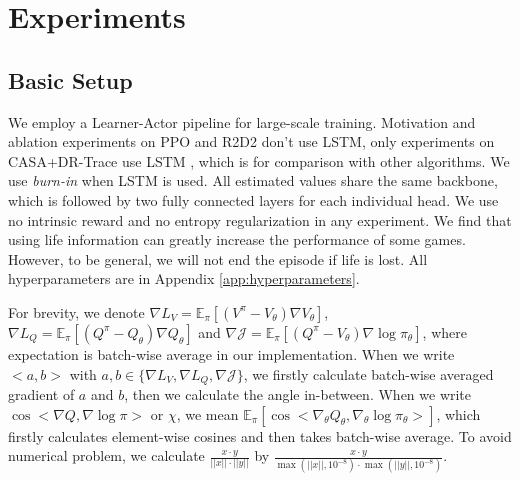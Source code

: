 \section{Experiments}
\label{sec:experiments}



\normalsize



\subsection{Basic Setup}
\label{sec:basic_setup}

We employ a Learner-Actor pipeline \citep{impala} for large-scale training.
{ Motivation and ablation experiments on PPO and R2D2 don't use LSTM, only experiments on CASA+DR-Trace use LSTM \citep{lstm}, which is for comparison with other algorithms.}
We use \textit{burn-in} \citep{r2d2} { when LSTM is used.}
All estimated values share the same backbone, which is followed by two fully connected layers for each individual head.
We use no intrinsic reward and no entropy regularization in any experiment.
We find that using life information can greatly increase the performance of some games. 
However, to be general, we will not end the episode if life is lost.
All hyperparameters are in Appendix \ref{app:hyperparameters}.

{ For brevity, we denote $\nabla L_V = \mathbb{E}_\pi [(V^\pi - V_\theta)\nabla V_\theta]$, $\nabla L_Q = \mathbb{E}_\pi [(Q^\pi - Q_\theta)\nabla Q_\theta]$ and $\nabla \mathcal{J} = \mathbb{E}_\pi [(Q^\pi - V_\theta)\nabla \log \pi_\theta]$, where expectation is batch-wise average in our implementation. 
When we write $<a, b>$ with $a, b \in \{\nabla L_V, \nabla L_Q, \nabla \mathcal{J}\}$, we firstly calculate batch-wise averaged gradient of $a$ and $b$, then we calculate the angle in-between. 
When we write $\cos<\nabla Q, \nabla \log \pi>$ or $\chi$, we mean $\mathbb{E}_\pi [\cos <\nabla_\theta Q_\theta, \nabla_\theta \log \pi_\theta>]$, which firstly calculates element-wise cosines and then takes batch-wise average.
To avoid numerical problem, we calculate $\frac{x\cdot y}{||x||\cdot||y||}$ by $\frac{x\cdot y}{\max(||x||, 10^{-8})\cdot \max(||y||, 10^{-8})}$.
}

